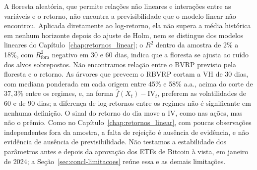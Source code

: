 A floresta aleatória, que permite relações não lineares e interações entre
as variáveis e o retorno, não encontra a previsibilidade que o modelo linear
não encontrou. Aplicada diretamente ao log-retorno, ela não supera a média
histórica em nenhum horizonte depois do ajuste de Holm, nem se distingue dos
modelos lineares do Capítulo~\ref{chap:retornos_linear}; o $R^2$ dentro da
amostra de 2\% a 18\%, com $R^2_{\text{fora}}$ negativo em 30 e 60 dias,
indica que a floresta se ajusta ao ruído dos alvos sobrepostos. Não
encontramos relação entre o BVRP previsto pela floresta e o retorno. As árvores que preveem
o RBVRP cortam a VH de 30 dias, com mediana ponderada em cada origem entre
45\% e 58\% a.a., acima do corte de $37{,}3\%$ entre os regimes, e, na forma
$\hat f(X_t) - \text{IV}_t$, preferem as volatilidades de 60 e de 90 dias;
a diferença de log-retornos entre os regimes não é significante em nenhuma
definição. O sinal do retorno do dia move a IV, como nas ações, mas não o
prêmio. Como no Capítulo~\ref{chap:retornos_linear}, com poucas observações
independentes fora da amostra, a falta de rejeição é ausência de evidência,
e não evidência de ausência de previsibilidade. Não testamos a estabilidade
dos parâmetros antes e depois da aprovação dos ETFs de Bitcoin à vista, em
janeiro de 2024; a Seção~\ref{sec:concl-limitacoes} reúne essa e as demais
limitações.
